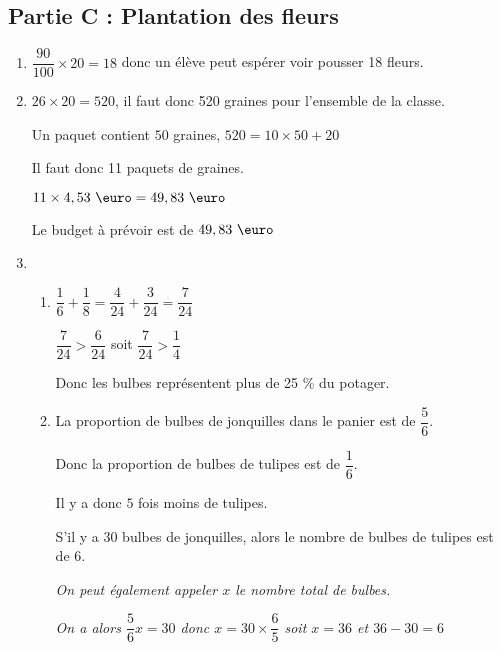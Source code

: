 \subsection*{Partie C : Plantation des fleurs}
\begin{enumerate}
    \item $\dfrac{90}{100}\times 20 = 18$ donc un élève peut espérer voir pousser 18 fleurs.
    \item $26\times 20 = 520$, il faut donc 520 graines pour l’ensemble de la classe.
    
    Un paquet contient $50$ graines, $520 = 10\times 50 + 20$
    
    Il faut donc 11 paquets de graines. 

    $11\times 4,53~\text{\euro}=49,83~\text{\euro}$

    Le budget à prévoir est de $49,83~\text{\euro}$

    \item 
    \begin{enumerate}
        \item $\dfrac{1}{6} +\dfrac{1}{8} = \dfrac{4}{24}+\dfrac{3}{24}=\dfrac{7}{24}$
        
        $\dfrac{7}{24}>\dfrac{6}{24}$ soit $\dfrac{7}{24}>\dfrac{1}{4}$ 
        
        Donc les bulbes représentent plus de 25 \% du potager.

        \item La proportion de bulbes de jonquilles dans le panier est de $\dfrac{5}{6}$.
        
        Donc la proportion de bulbes de tulipes est de $\dfrac{1}{6}$.
        
        Il y a donc $5$ fois moins de tulipes.
        
        S'il y a $30$ bulbes de jonquilles, alors le nombre de bulbes de tulipes est de $6$.

        \medskip
        \textit{On peut également appeler $x$ le nombre total de bulbes.}
        
        \textit{On a alors $\dfrac{5}{6}x = 30$ donc $x=30\times \dfrac{6}{5}$ soit $x=36$ et $36-30=6$}        
    \end{enumerate}
\end{enumerate}
